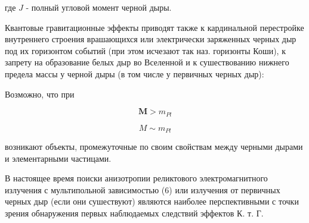 \documentclass[10pt]{article}
\begin{document}
где $J$ - полный угловой момент черной дыры.



Квантовые гравитационные эффекты приводят также к кардинальной перестройке внутреннего строения врашающихся или электрически заряженных черных дыр под их горизонтом событий (при этом исчезают так наз. горизонты Коши), к запрету на образование белых дыр во Вселенной и к сушествованию нижнего предела массы у черной дыры (в том числе у первичных черных дыр):



Возможно, что при



\[

\boldsymbol{M}>m_{P l}

\]



\[

M \sim m_{P l}

\]



возникают объекты, промежуточные по своим свойствам между черными дырами и элементарными частицами.



В настоящее время поиски анизотропии реликтового электромагнитного излучения с мультипольной зависимостью (6) или излучения от первичных черных дыр (если они сушествуют) являются наиболее перспективными с точки зрения обнаружения первых наблюдаемых следствий эффектов К. т. Г.
\end{document}
